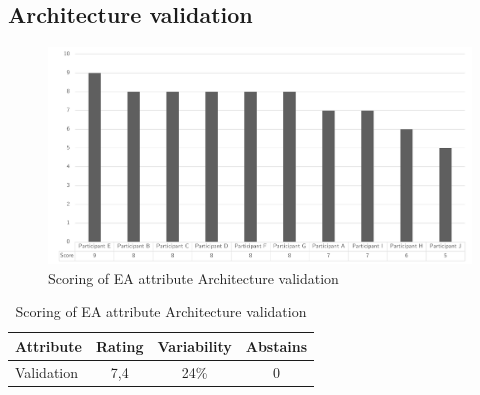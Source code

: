 \subsection{Architecture validation}
\begin{figure}[H]
	\centering
	\includegraphics[width=0.9\linewidth]{images/scoreeavalidation}
	\caption[Scoring of EA attribute Architecture validation]{Scoring of EA attribute Architecture validation}
	\label{fig:appscoringeavalidation}
\end{figure}
\begin{table}[H]
	\centering
	\begin{tabular}{p{}ccc}
		\toprule
		\textbf{Attribute} & \textbf{Rating} & \textbf{Variability} & \textbf{Abstains} \\
		\midrule
		Validation & 7,4 & 24\% & 0 \\%
		\bottomrule
	\end{tabular}%
	\caption[Scoring of EA attribute Architecture validation]{Scoring of EA attribute Architecture validation}
	\label{tab:appscoringeavalidation}%
\end{table}%
\newpage
